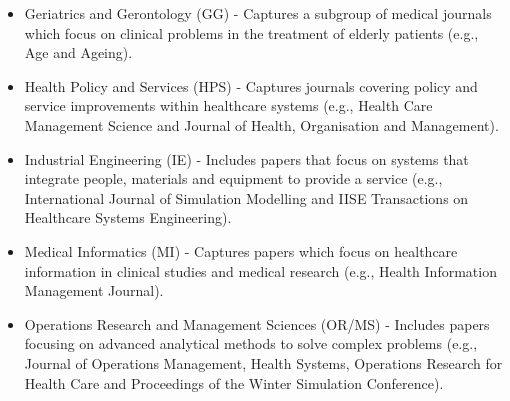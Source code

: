 \documentclass[../thesis.tex]{subfiles}
\begin{document}
\begin{itemize}
    \item Geriatrics and Gerontology (GG) - Captures a subgroup of medical journals which focus on clinical problems in the treatment of elderly patients (e.g., Age and Ageing).
    \item Health Policy and Services (HPS) - Captures journals covering policy and service improvements within healthcare systems (e.g., Health Care Management Science and Journal of Health, Organisation and Management).
    \item Industrial Engineering (IE) - Includes papers that focus on systems that integrate people, materials and equipment to provide a service (e.g., International Journal of Simulation Modelling and IISE Transactions on Healthcare Systems Engineering).
    \item Medical Informatics (MI) - Captures papers which focus on healthcare information in clinical studies and medical research (e.g., Health Information Management Journal).
    \item Operations Research and Management Sciences (OR/MS) - Includes papers focusing on advanced analytical methods to solve complex problems (e.g., Journal of Operations Management, Health Systems, Operations Research for Health Care and Proceedings of the Winter Simulation Conference).
\end{itemize}
\end{document}
